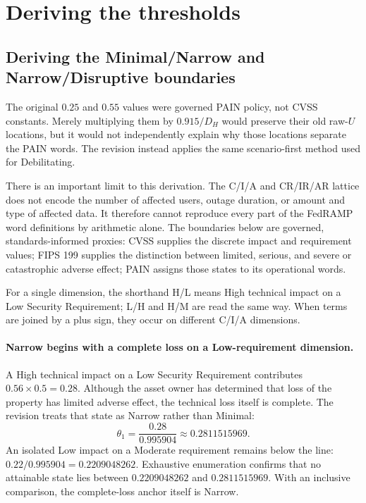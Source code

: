 \documentclass[11pt]{article}
\begin{document}
\section{Deriving the thresholds}
\label{sec:thresholds}

\subsection{Deriving the Minimal/Narrow and Narrow/Disruptive boundaries}

The original $0.25$ and $0.55$ values were governed PAIN policy, not CVSS constants.
Merely multiplying them by $0.915/D_H$ would preserve their old raw-$U$ locations,
but it would not independently explain why those locations separate the PAIN words.
The revision instead applies the same scenario-first method used for Debilitating.

There is an important limit to this derivation. The C/I/A and CR/IR/AR lattice does
not encode the number of affected users, outage duration, or amount and type of
affected data. It therefore cannot reproduce every part of the FedRAMP word
definitions by arithmetic alone. The boundaries below are governed, standards-informed
proxies: CVSS supplies the discrete impact and requirement values; FIPS 199 supplies
the distinction between limited, serious, and severe or catastrophic adverse effect;
PAIN assigns those states to its operational words.

For a single dimension, the shorthand H/L means High technical impact on a Low
Security Requirement; L/H and H/M are read the same way. When terms are joined by
a plus sign, they occur on different C/I/A dimensions.

\paragraph{Narrow begins with a complete loss on a Low-requirement dimension.}
A High technical impact on a Low Security Requirement contributes
$0.56\times0.5=0.28$. Although the asset owner has determined that loss of the
property has limited adverse effect, the technical loss itself is complete. The
revision treats that state as Narrow rather than Minimal:
\begin{equation}
\boxed{\theta_1=\frac{0.28}{0.995904}\approx0.2811515969}.
\label{eq:theta1}
\end{equation}
An isolated Low impact on a Moderate requirement remains below the line:
$0.22/0.995904=0.2209048262$. Exhaustive enumeration confirms that no attainable
state lies between $0.2209048262$ and $0.2811515969$. With an inclusive comparison,
the complete-loss anchor itself is Narrow.
\end{document}

